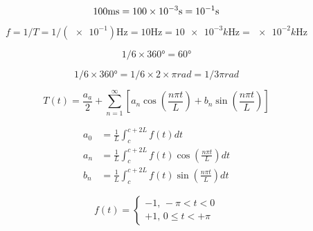 \documentclass{minimal}
\begin{document}
\begin{equation*}
100 \unit{ms} = \num{100e-3} \unit{s} = \num{e-1} \unit{s} \\
\end{equation*}

\begin{equation*}
  f = 1/T = 1/(\num{e-1})\unit{\hertz} = 10 \unit{\hertz} = \num{10e-3} k\unit{\hertz}  = \num{e-2} k\unit{\hertz}
\end{equation*}

\begin{equation*}
 1/6 \times \ang{360} = \ang{60}
\end{equation*}

\begin{equation*}
 1/6 \times \ang{360} = 1/6 \times 2 \times \pi \unit{rad} = 1 / 3 \pi \unit{rad}
\end{equation*}

\begin{equation*}
  T(t) = \frac{a_a}{2} + \sum_{n=1}^{\infty}\left[{a_n \cos\left(\frac{n\pi t}{L}\right) + b_n \sin\left(\frac{n\pi t}{L}\right)}\right]
\end{equation*}

\begin{align*}
  a_0 &= \frac{1}{L}\int_{c}^{c + 2L}f(t) dt \\
  a_n &= \frac{1}{L}\int_{c}^{c + 2L}f(t)\cos\left(\frac{n\pi t}{L}\right) dt \\
  b_n &= \frac{1}{L}\int_{c}^{c + 2L}f(t)\sin\left(\frac{n\pi t}{L}\right) dt
\end{align*}

\begin{equation*}
  f(t) =
  \begin{cases}
    -1,\,-\pi < t < 0 \\
    +1,\, 0 \le t < +\pi
  \end{cases}
\end{equation*}
\end{document}
